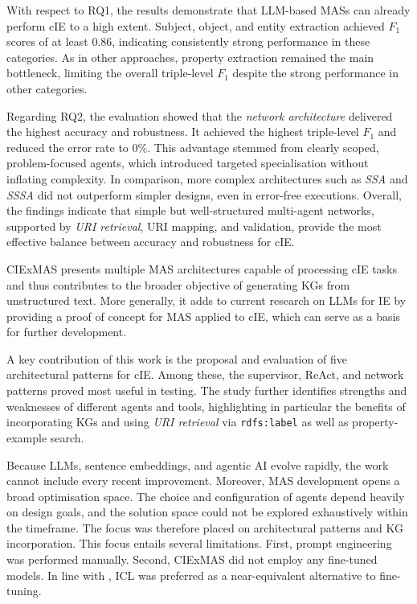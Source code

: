 \documentclass[a4paper,oneside,bibliography=totoc]{scrbook}
\begin{document}
With respect to RQ1, the results demonstrate that \ac{LLM}-based \acp{MAS} can already perform \ac{cIE} to a high extent. Subject, object, and entity extraction achieved $F_{1}$ scores of at least 0.86, indicating consistently strong performance in these categories. As in other approaches, property extraction remained the main bottleneck, limiting the overall triple-level $F_{1}$ despite the strong performance in other categories.

Regarding RQ2, the evaluation showed that the \textit{network architecture} delivered the highest accuracy and robustness. It achieved the highest triple-level $F_{1}$ and reduced the error rate to 0\%. This advantage stemmed from clearly scoped, problem-focused agents, which introduced targeted specialisation without inflating complexity. In comparison, more complex architectures such as \textit{\ac{SSA}} and \textit{\ac{SSSA}} did not outperform simpler designs, even in error-free executions. Overall, the findings indicate that simple but well-structured multi-agent networks, supported by \textit{\ac{URI} retrieval}, \ac{URI} mapping, and validation, provide the most effective balance between accuracy and robustness for \ac{cIE}.

CIExMAS presents multiple \ac{MAS} architectures capable of processing \ac{cIE} tasks and thus contributes to the broader objective of generating \acp{KG} from unstructured text. More generally, it adds to current research on \acp{LLM} for \ac{IE} by providing a proof of concept for \ac{MAS} applied to \ac{cIE}, which can serve as a basis for further development.

A key contribution of this work is the proposal and evaluation of five architectural patterns for \ac{cIE}. Among these, the supervisor, ReAct, and network patterns proved most useful in testing. The study further identifies strengths and weaknesses of different agents and tools, highlighting in particular the benefits of incorporating \acp{KG} and using \textit{\ac{URI} retrieval} via \texttt{rdfs:label} as well as property-example search.

Because \acp{LLM}, sentence embeddings, and agentic AI evolve rapidly, the work cannot include every recent improvement. Moreover, \ac{MAS} development opens a broad optimisation space. The choice and configuration of agents depend heavily on design goals, and the solution space could not be explored exhaustively within the timeframe. The focus was therefore placed on architectural patterns and \ac{KG} incorporation. This focus entails several limitations. First, prompt engineering was performed manually. Second, CIExMAS did not employ any fine-tuned models. In line with \citet{Brown2020}, \ac{ICL} was preferred as a near-equivalent alternative to fine-tuning.
\end{document}
